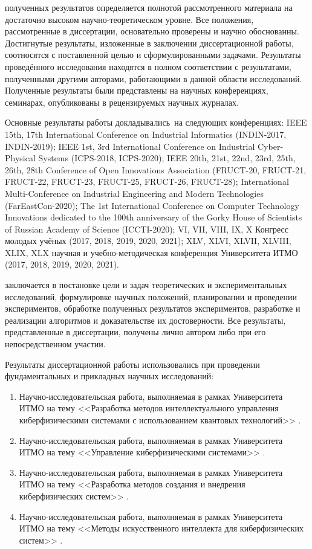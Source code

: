 {\reliability} полученных результатов определяется полнотой рассмот­ренного материала на достаточно высоком научно-­теоретическом уровне. Все положения, рассмотренные в диссертации, основательно проверены и научно обоснованны. Достигнутые результаты, изложенные в заключении диссертационной работы, соотносятся с поставленной целью и сформулированными задачами. Результаты проведённого исследования находятся в полном соответствии с результатами, полученными другими авторами, работающими в данной области исследований. Полученные результаты были представлены на научных конференциях, семинарах, опубликованы в рецензируемых научных журналах. 

{\probation}
Основные результаты работы докладывались~на следующих конференциях: IEEE 15th, 17th International Conference on Industrial Informatics (INDIN-2017, INDIN-2019); IEEE 1st, 3rd International Conference on Industrial Cyber-Physical Systems (ICPS-2018, ICPS-2020); IEEE 20th, 21st, 22nd, 23rd, 25th, 26th, 28th Conference of Open Innovations Association (FRUCT-20, FRUCT-21, FRUCT-22, FRUCT-23, FRUCT-25, FRUCT-26, FRUCT-28); International Multi-Conference on Industrial Engineering and Modern Technologies (FarEastCon-2020); The 1st International Conference on Computer Technology Innovations dedicated to the 100th anniversary of the Gorky House of Scientists of Russian Academy of Science (ICCTI-2020); VI, VII, VIII, IX, X  Конгресс молодых учёных (2017, 2018, 2019, 2020, 2021); XLV, XLVI, XLVII, XLVIII, XLIX, XLX  научная и учебно-методическая конференция Университета \mbox{ИТМО} (2017, 2018, 2019, 2020, 2021).

{\contribution} заключается в постановке цели и задач теоретических и экспериментальных исследований, формулировке научных положений, планировании и проведении экспериментов, обработке полученных результатов экспериментов, разработке и реализации алгоритмов и доказательстве их достоверности. Все результаты, представленные в диссертации, получены лично автором либо при его непосредственном участии. 

{\implementation} Результаты диссертационной работы использовались при проведении фундаментальных и прикладных научных исследований:

\begin{enumerate}[beginpenalty=10000]
	\item Научно-исследовательская работа, выполняемая в рамках Университета ИТМО на тему <<Разработка методов интеллектуального управления киберфизическими системами с использованием квантовых технологий>>  .
	\item Научно-исследовательская работа, выполняемая в рамках Университета ИТМО на тему <<Управление киберфизическими системами>>  .
	\item Научно-исследовательская работа, выполняемая в рамках Университета ИТМО на тему <<Разработка методов создания и внедрения киберфизических систем>>  .
	\item Научно-исследовательская работа, выполняемая в рамках Университета ИТМО на тему <<Методы искусственного интеллекта для киберфизических систем>>  .
\end{enumerate}


